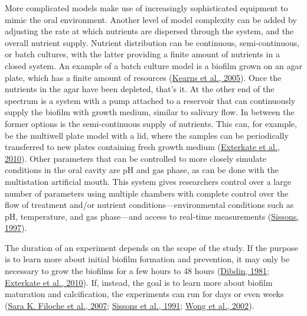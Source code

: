 \documentclass[
  letterpaper,
]{book}
\begin{document}
More complicated models make use of increasingly sophisticated equipment
to mimic the oral environment. Another level of model complexity can be
added by adjusting the rate at which nutrients are dispersed through the
system, and the overall nutrient supply. Nutrient distribution can be
continuous, semi-continuous, or batch cultures, with the latter
providing a finite amount of nutrients in a closed system. An example of
a batch culture model is a biofilm grown on an agar plate, which has a
finite amount of resources
(\protect\hyperlink{ref-kearnsMasterRegulator2005}{Kearns et al.,
2005}). Once the nutrients in the agar have been depleted, that's it. At
the other end of the spectrum is a system with a pump attached to a
reservoir that can continuously supply the biofilm with growth medium,
similar to salivary flow. In between the former options is the
semi-continuous supply of nutrients. This can, for example, be the
multiwell plate model with a lid, where the samples can be periodically
transferred to new plates containing fresh growth medium
(\protect\hyperlink{ref-extercateAAA2010}{Exterkate et al., 2010}).
Other parameters that can be controlled to more closely simulate
conditions in the oral cavity are pH and gas phase, as can be done with
the multistation artificial mouth. This system gives researchers control
over a large number of parameters using multiple chambers with complete
control over the flow of treatment and/or nutrient
conditions---environmental conditions such as pH, temperature, and gas
phase---and access to real-time measurements
(\protect\hyperlink{ref-sissonsArtificialPlaque1997}{Sissons, 1997}).

The duration of an experiment depends on the scope of the study. If the
purpose is to learn more about initial biofilm formation and prevention,
it may only be necessary to grow the biofilms for a few hours to 48
hours (\protect\hyperlink{ref-dibdinDiffusionSugars1981}{Dibdin, 1981};
\protect\hyperlink{ref-extercateAAA2010}{Exterkate et al., 2010}). If,
instead, the goal is to learn more about biofilm maturation and
calcification, the experiments can run for days or even weeks
(\protect\hyperlink{ref-filocheFluorescenceAssay2007}{Sara K. Filoche et
al., 2007};
\protect\hyperlink{ref-sissonsMultistationPlaque1991}{Sissons et al.,
1991}; \protect\hyperlink{ref-wongCalciumPhosphate2002}{Wong et al.,
2002}).
\end{document}
